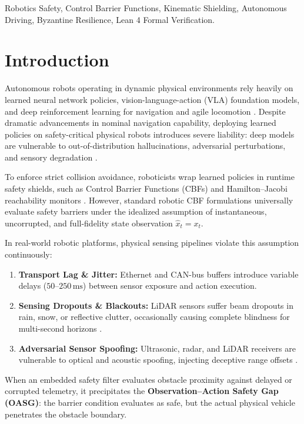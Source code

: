 \documentclass[conference]{IEEEtran}
\begin{document}
\begin{IEEEkeywords}
Robotics Safety, Control Barrier Functions, Kinematic Shielding, Autonomous Driving, Byzantine Resilience, Lean 4 Formal Verification.
\end{IEEEkeywords}

\section{Introduction}
Autonomous robots operating in dynamic physical environments rely heavily on learned neural network policies, vision-language-action (VLA) foundation models, and deep reinforcement learning for navigation and agile locomotion \cite{wabersich_predictive_2021,karkus_diff_cbf_2022}. Despite dramatic advancements in nominal navigation capability, deploying learned policies on safety-critical physical robots introduces severe liability: deep models are vulnerable to out-of-distribution hallucinations, adversarial perturbations, and sensory degradation \cite{annurev_safety_filter_2024,shoukry_imhotep_2017}.

To enforce strict collision avoidance, roboticists wrap learned policies in runtime safety shields, such as Control Barrier Functions (CBFs) \cite{ames_cbf_2019,taylor_cbf_tac_2020} and Hamilton--Jacobi reachability monitors \cite{bansal_hamilton_jacobi_2017}. However, standard robotic CBF formulations universally evaluate safety barriers under the idealized assumption of instantaneous, uncorrupted, and full-fidelity state observation $\hat{x}_t = x_t$.

In real-world robotic platforms, physical sensing pipelines violate this assumption continuously:
\begin{enumerate}
    \item \textbf{Transport Lag \& Jitter:} Ethernet and CAN-bus buffers introduce variable delays ($50\text{--}250\,\text{ms}$) between sensor exposure and action execution.
    \item \textbf{Sensing Dropouts \& Blackouts:} LiDAR sensors suffer beam dropouts in rain, snow, or reflective clutter, occasionally causing complete blindness for multi-second horizons \cite{cardenas_cps_security_2008}.
    \item \textbf{Adversarial Sensor Spoofing:} Ultrasonic, radar, and LiDAR receivers are vulnerable to optical and acoustic spoofing, injecting deceptive range offsets \cite{shoukry_imhotep_2017}.
\end{enumerate}

When an embedded safety filter evaluates obstacle proximity against delayed or corrupted telemetry, it precipitates the \textbf{Observation--Action Safety Gap (OASG)}: the barrier condition evaluates as safe, but the actual physical vehicle penetrates the obstacle boundary.
\end{document}
